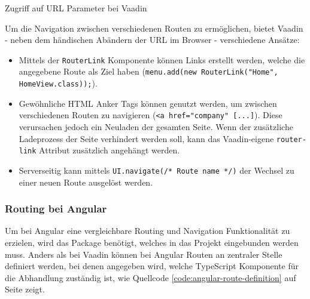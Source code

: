 \documentclass[a4paper,12pt,twoside]{scrreprt}
\begin{document}
\begin{listing}[ht]
    \inputminted[fontsize=\footnotesize,linenos]{java}{code/url_params_vaadin.java}
    \caption[Zugriff auf URL Parameter bei Vaadin]{Zugriff auf URL Parameter bei Vaadin}
    \label{code:url-params-vaadin}
\end{listing}

\smallskip

Um die Navigation zwischen verschiedenen Routen zu ermöglichen, bietet Vaadin - neben dem händischen Abändern der URL im Browser - verschiedene Ansätze:

\begin{itemize}
    \item Mittels der \texttt{RouterLink} Komponente können Links erstellt werden, welche die angegebene Route als Ziel haben (\texttt{menu.add(new RouterLink("Home", HomeView.class));}). \parencite[][Framework - Routing and Navigation - Navigating Between Routes]{vaadin_ltd_documentation_nodate}
    \item Gewöhnliche HTML Anker Tags können genutzt werden, um zwischen verschiedenen Routen zu navigieren (\texttt{<a href="company" [...]}). Diese verursachen jedoch ein Neuladen der gesamten Seite. Wenn der zusätzliche Ladeprozess der Seite verhindert werden soll, kann das Vaadin-eigene \texttt{router-link} Attribut zusätzlich angehängt werden. \parencite[][Framework - Routing and Navigation - Navigating Between Routes]{vaadin_ltd_documentation_nodate}
    \item Serverseitig kann mittels \texttt{UI.navigate(/* Route name */)} der Wechsel zu einer neuen Route ausgelöst werden. \parencite[][Framework - Routing and Navigation - Navigating Between Routes]{vaadin_ltd_documentation_nodate}
\end{itemize}

\subsubsection{Routing bei Angular}
\label{sub-sub-sec:routing-herangehensweise-angular}
Um bei Angular eine vergleichbare Routing und Navigation Funktionalität zu erzielen, wird das  Package benötigt, welches in das Projekt eingebunden werden muss. Anders als bei Vaadin können bei Angular Routen an zentraler Stelle definiert werden, bei denen angegeben wird, welche TypeScript Komponente für die Abhandlung zuständig ist, wie Quellcode \ref{code:angular-route-definition} auf Seite \pageref{code:angular-route-definition} zeigt. \parencite[][]{google_llc_angular_nodate}
\end{document}
